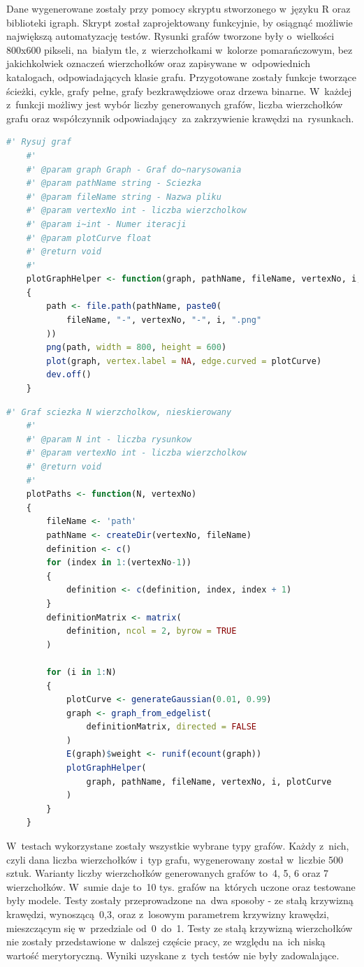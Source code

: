 Dane wygenerowane zostały przy pomocy skryptu stworzonego w~języku R oraz biblioteki igraph.
Skrypt został zaprojektowany funkcyjnie, by osiągnąć możliwie największą automatyzację testów.
Rysunki grafów tworzone były o~wielkości 800x600 pikseli, na~białym tle, z~wierzchołkami w~kolorze pomarańczowym,
bez jakichkolwiek oznaczeń wierzchołków oraz zapisywane w~odpowiednich katalogach, odpowiadających klasie grafu.
Przygotowane zostały funkcje tworzące ścieżki, cykle, grafy pełne, grafy bezkrawędziowe oraz drzewa binarne.
W~każdej z~funkcji możliwy jest wybór liczby generowanych grafów, liczba wierzchołków grafu
oraz współczynnik odpowiadający~za zakrzywienie krawędzi na~rysunkach.

\begin{lstlisting}[language=R,caption=Listing skryptu rysującego grafy,label={tests-generation-1}]
	#' Rysuj graf
	#'
	#' @param graph Graph - Graf do~narysowania
	#' @param pathName string - Sciezka
	#' @param fileName string - Nazwa pliku
	#' @param vertexNo int - liczba wierzcholkow
	#' @param i~int - Numer iteracji
	#' @param plotCurve float
	#' @return void
	#'
	plotGraphHelper <- function(graph, pathName, fileName, vertexNo, i, plotCurve)
	{
		path <- file.path(pathName, paste0(
			fileName, "-", vertexNo, "-", i, ".png"
		))
		png(path, width = 800, height = 600)
		plot(graph, vertex.label = NA, edge.curved = plotCurve)
		dev.off()
	}	
\end{lstlisting}

\begin{lstlisting}[language=R,caption=Listing funkcji tworzącej ścieżkę,label={tests-generation-2}]
	#' Graf sciezka N wierzcholkow, nieskierowany
	#'
	#' @param N int - liczba rysunkow
	#' @param vertexNo int - liczba wierzcholkow
	#' @return void
	#'
	plotPaths <- function(N, vertexNo)
	{
		fileName <- 'path'
		pathName <- createDir(vertexNo, fileName)
		definition <- c()
		for (index in 1:(vertexNo-1))
		{
			definition <- c(definition, index, index + 1)
		}
		definitionMatrix <- matrix(
			definition, ncol = 2, byrow = TRUE
		)
		
		for (i in 1:N)
		{
			plotCurve <- generateGaussian(0.01, 0.99)
			graph <- graph_from_edgelist(
				definitionMatrix, directed = FALSE
			)
			E(graph)$weight <- runif(ecount(graph))
			plotGraphHelper(
				graph, pathName, fileName, vertexNo, i, plotCurve
			)
		}
	}
\end{lstlisting}

W~testach wykorzystane zostały wszystkie wybrane typy grafów.
Każdy z~nich, czyli dana liczba wierzchołków i~typ grafu, wygenerowany został w~liczbie 500 sztuk.
Warianty liczby wierzchołków generowanych grafów to~4, 5, 6 oraz 7 wierzchołków.
W~sumie daje to~10 tys. grafów na~których uczone oraz testowane były modele.
Testy zostały przeprowadzone na~dwa sposoby - ze stałą krzywizną krawędzi, wynoszącą~0,3,
oraz z~losowym parametrem krzywizny krawędzi, mieszczącym się w~przedziale od~0~do~1.
Testy ze stałą krzywizną wierzchołków nie zostały przedstawione w~dalszej częście pracy,
ze względu na~ich niską wartość merytoryczną. Wyniki uzyskane z~tych testów nie były zadowalające.

